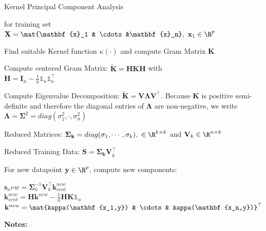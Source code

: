 \documentclass[english]{latex4ei/latex4ei_sheet}
\begin{document}
\begin{sectionbox}
\begin{cookbox}{Kernel Principal Component Analysis}
    \item  for training set $\mathbf{X}=\mat{\mathbf{x}_1 & \cdots &\mathbf{x}_n}, \ \mathbf{x}_1\in\R^p$
	\item Find suitable Kernel function $\kappa(\cdot)$ and compute Gram Matrix $\mathbf{K}$
	\item Compute centered Gram Matrix: $\mathbf{\tilde{K}=HKH}$ with\\ $\mathbf{H=I}_n-\frac{1}{n}\mathds{1}_n\mathds{1}_n^{\top}$
	\item Compute Eigenvalue Decomposition: $\mathbf{\tilde{K}=V\Lambda V^{\top}}$. Because $\mathbf{K}$ is positive semi-definite and therefore the diagonal entries of $\mathbf{\Lambda}$ are non-negative, we write $\mathbf{\Lambda=\Sigma}^2=diag(\sigma_1^2, \cdot, \sigma_n^2)$
	\item Reduced Matrices: $\mathbf{\Sigma_k}=diag(\sigma_1,\cdots,\sigma_k),\ \in\R^{k\times k}$ and $\mathbf{V}_k\in\R^{n\times k}$
	\item Reduced Training Data: $\mathbf{S=\Sigma_kV}_k^{\top}$
	\item For new datapoint $\mathbf{y}\in\R^p$, compute new components: 
	\begin{center}
		$\mathbf{s}_new=\mathbf{\Sigma}_k^{-1}\mathbf{V}_k^{\top}\mathbf{k}_{cent}^{new}$\\
	    $\mathbf{k}_{cent}^{new}=\mathbf{Hk}_{}^{new}-\frac{1}{n}\mathbf{HK}\mathds{1}_n$\\
		$\mathbf{k}^{new}=\mat{kappa(\mathbf{x_1,y}) & \cdots & kappa(\mathbf{x_n,y})}^{\top}$
	\end{center}
\end{cookbox}
\end{sectionbox}
\textbf{Notes:}

\newpage
\end{document}

